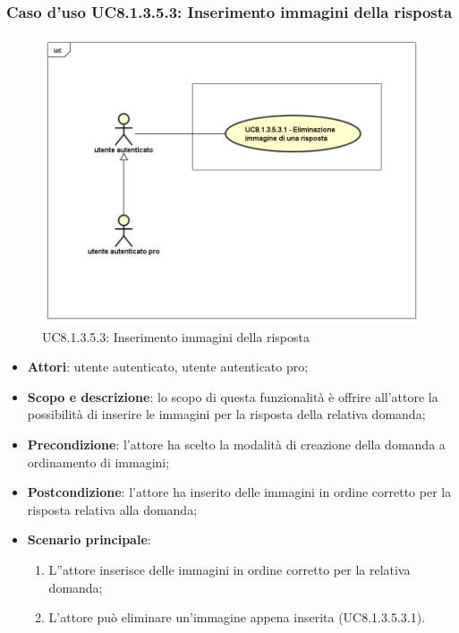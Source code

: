 \subsubsection{Caso d’uso UC8.1.3.5.3: Inserimento immagini della risposta}
\label{UC8.1.3.5.3}
\begin{figure}[h]
	\centering
	\includegraphics[scale=0.45,keepaspectratio]{UML/UC8_1_3_5_3.png}
	\caption{UC8.1.3.5.3: Inserimento immagini della risposta}
\end{figure}
\begin{itemize}
	\item\textbf{Attori}: utente autenticato, utente autenticato pro;
	\item\textbf{Scopo e descrizione}: lo scopo di questa funzionalità è offrire all'attore  la possibilità di inserire le immagini per la risposta della relativa domanda;
	\item\textbf{Precondizione}: l'attore ha scelto la modalità di creazione della domanda a ordinamento di immagini; 
	\item \textbf{Postcondizione}: l'attore ha inserito delle immagini in ordine corretto per la risposta relativa alla domanda;
	\item\textbf{Scenario principale}:
		\begin{enumerate}
			\item L''attore inserisce delle immagini in ordine corretto per la relativa domanda;
			\item L'attore può eliminare un'immagine appena inserita (UC8.1.3.5.3.1).
		\end{enumerate}
\end{itemize}

